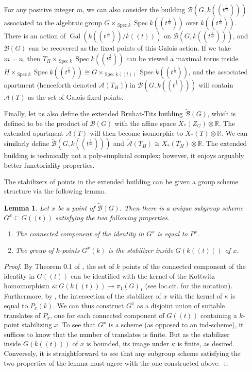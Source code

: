 \documentclass[12pt]{article}
\newcommand{\on}{\operatorname}
\DeclareMathOperator{\Spec}{Spec}
\newtheorem{lemma}[theorem]{Lemma}
\theoremstyle{remark}
\begin{document}
For any positive integer $m$, we can also consider the building $\mathcal{B}(G,k((t^{\frac{1}{m}})))$ associated to the algebraic group $G\times_{\Spec k}\Spec k((t^{\frac{1}{m}}))$ over $k((t^{\frac{1}{m}}))$. There is an action of $\on{Gal}(k((t^{\frac{1}{m}}))/k((t)))$ on $\mathcal{B}(G,k((t^{\frac{1}{m}})))$, and $\mathcal{B}(G)$ can be recovered as the fixed points of this Galois action. If we take $m=n$, then $T_H\times_{\Spec k}\Spec k((t^{\frac{1}{n}}))$ can be viewed a maximal torus inside $H\times_{\Spec k}\Spec k((t^{\frac{1}{n}}))\cong G\times_{\Spec k((t))}\Spec k((t^{\frac{1}{n}}))$, and the associated apartment (henceforth denoted $\mathcal{A}(T_H)$) in $\mathcal{B}(G,k((t^{\frac{1}{n}})))$ will contain $\mathcal{A}(T)$ as the set of Galois-fixed points.

Finally, let us also define the extended Bruhat-Tits building $\widetilde{\mathcal{B}}(G)$, which is defined to be the product of $\mathcal{B}(G)$ with the affine space $X_*(Z_G)\otimes\mathbb{R}$. The extended apartment $\widetilde{\mathcal{A}}(T)$ will then become isomorphic to $X_*(T)\otimes\mathbb{R}$. We can similarly define $\widetilde{\mathcal{B}}(G,k((t^{\frac{1}{m}})))$ and $\widetilde{\mathcal{A}}(T_H)\cong X_*(T_H)\otimes\mathbb{R}$. The extended building is technically not a poly-simplicial complex; however, it enjoys arguably better functoriality properties. 

The stabilizers of points in the extended building can be given a group scheme structure via the following lemma.

\begin{lemma}\label{stabilizerconstruction}
Let $x$ be a point of $\widetilde{\mathcal{B}}(G)$. Then there is a unique subgroup scheme $G^x\subseteq G((t))$ satisfying the two following properties.
\begin{enumerate}
\item The connected component of the identity in $G^x$ is equal to $P^x$.
\item The group of $k$-points $G^x(k)$ is the stabilizer inside $G(k((t)))$ of $x$.
\end{enumerate}
\end{lemma}

\begin{proof}
By Theorem 0.1 of \cite{pappasrapoport}, the set of $k$ points of the connected component of the identity in $G((t))$ can be identified with the kernel of the Kottwitz homomorphism $\kappa:G(k((t)))\rightarrow\pi_1(G)_I$ (see loc.cit. for the notation). Furthermore, by \cite{onparahoricsubgroups}, the intersection of the stabilizer of $x$ with the kernel of $\kappa$ is equal to $P_x(k)$. We can thus construct $G^x$ as a disjoint union of suitable translates of $P_x$, one for each connected component of $G((t))$ containing a $k$-point stabilizing $x$. To see that $G^x$ is a scheme (as opposed to an ind-scheme), it suffices to know that the number of translates is finite. But as the stabilizer inside $G(k((t)))$ of $x$ is bounded, its image under $\kappa$ is finite, as desired. Conversely, it is straightforward to see that any subgroup scheme satisfying the two properties of the lemma must agree with the one constructed above.
\end{proof}
\end{document}

